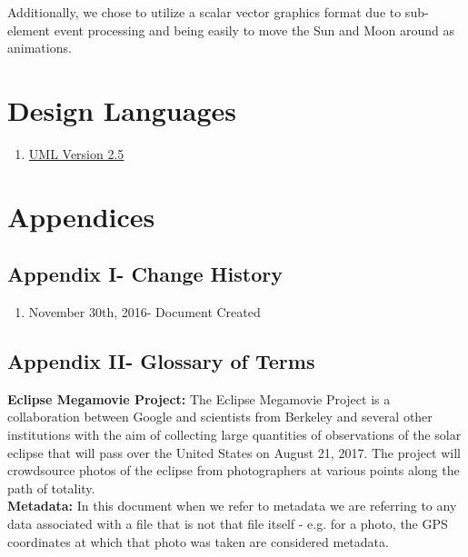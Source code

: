 \documentclass[10pt, onecolumn, draftclsnofoot, letterpaper, compsoc]{IEEEtran}
\begin{document}
Additionally, we chose to utilize a scalar vector graphics
format due to sub-element event processing and being easily
to move the Sun and Moon around as animations. \\

\section{Design Languages}

\begin{enumerate}
    \item \href{http://www.omg.org/spec/UML/2.5}{UML Version 2.5}
\end{enumerate}


\newpage
\section{Appendices}

\subsection{Appendix I- Change History}

\begin{enumerate}
\item November 30th, 2016- Document Created \\
\end{enumerate}

\subsection{Appendix II- Glossary of Terms}

\textbf{Eclipse Megamovie Project:}
The Eclipse Megamovie Project is a collaboration between Google 
and scientists from Berkeley and several other institutions with the 
aim of collecting large quantities of observations of the solar eclipse
that will pass over the United States on August 21, 2017. The project
will crowdsource photos of the eclipse from photographers at various 
points along the path of totality. \\

\noindent \textbf{Metadata:} In this document when we refer to metadata we are
referring to any data associated with a file that is not that file itself -
e.g. for a photo, the GPS coordinates at which that photo was taken are
considered metadata.\\
\end{document}
